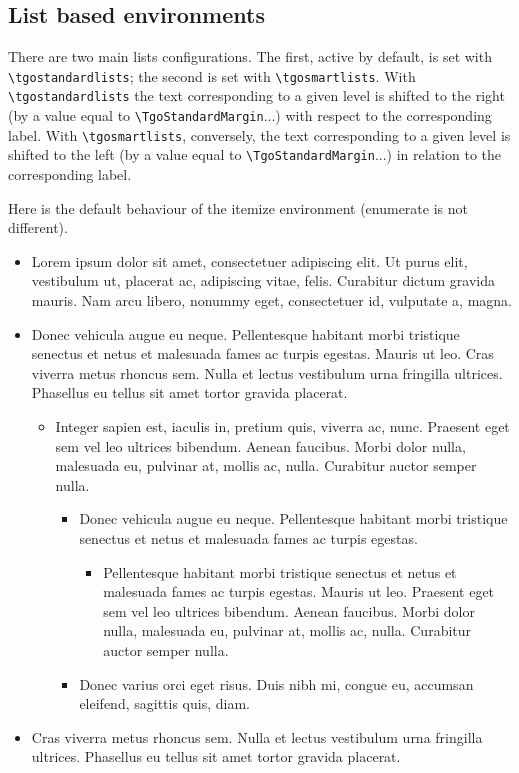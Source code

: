\documentclass[english,ColorTheme=Red,FontSize=10pt]{tango}
\newcommand\TO[1]{\textsf{#1}}
\begin{document}
\subsection{List based environments}
There are two main lists configurations. The first, active by default, is set with \verb+\tgostandardlists+; the second is set with \verb+\tgosmartlists+.
%
With \verb+\tgostandardlists+ the text corresponding to a given level is shifted to the right (by a value equal to \verb+\TgoStandardMargin+...) with respect to the corresponding label.
%
With \verb+\tgosmartlists+, conversely, the text corresponding to a given level is shifted to the left (by a value equal to \verb+\TgoStandardMargin+...) in relation to the corresponding label.
\renewtgolabels*\tgostandardlists

Here is the default behaviour of the \TO{itemize} environment (\TO{enumerate} is not different).
\begin{itemize}
\item Lorem ipsum dolor sit amet, consectetuer adipiscing elit. Ut purus elit, vestibulum ut, placerat ac, adipiscing vitae, felis. Curabitur dictum gravida mauris. Nam arcu libero, nonummy eget, consectetuer id, vulputate a, magna.
\item Donec vehicula augue eu neque. Pellentesque habitant morbi tristique senectus et netus et malesuada fames ac turpis egestas. Mauris ut leo. Cras viverra metus rhoncus sem. Nulla et lectus vestibulum urna fringilla ultrices. Phasellus eu tellus sit amet tortor gravida placerat.
\begin{itemize}
\item Integer sapien est, iaculis in, pretium quis, viverra ac, nunc. Praesent eget sem vel leo ultrices bibendum. Aenean faucibus. Morbi dolor nulla, malesuada eu, pulvinar at, mollis ac, nulla. Curabitur auctor semper nulla.
\begin{itemize}
\item Donec vehicula augue eu neque. Pellentesque habitant morbi tristique senectus et netus et malesuada fames ac turpis egestas.
\begin{itemize}
\item Pellentesque habitant morbi tristique senectus et netus et malesuada fames ac turpis egestas. Mauris ut leo. Praesent eget sem vel leo ultrices bibendum. Aenean faucibus. Morbi dolor nulla, malesuada eu, pulvinar at, mollis ac, nulla. Curabitur auctor semper nulla.
\end{itemize}
\item Donec varius orci eget risus. Duis nibh mi, congue eu, accumsan eleifend, sagittis quis, diam. 
\end{itemize}\end{itemize}
\item  Cras viverra metus rhoncus sem. Nulla et lectus vestibulum urna fringilla ultrices. Phasellus eu tellus sit amet tortor gravida placerat.
\end{itemize}
\end{document}
